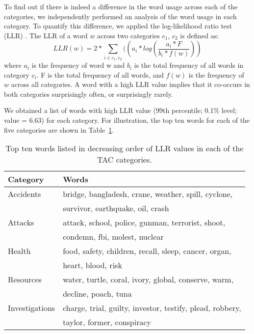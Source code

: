 To find out if there is indeed a difference in the word usage across each of the categories, we independently performed an analysis of the word usage in each category. To quantify this difference, we applied the log-likelihood ratio test (LLR) \cite{llr}. The LLR of a word $w$ across two categories $c_{1}$, $c_{2}$ is defined as:
\begin{displaymath}
LLR(w) = 2*\sum_{i\in {c_{1},c_{2}}}((a_i*log(\frac{a_i*F}{b_i*f(w)})) 
\end{displaymath}
where $a_i$ is the frequency of word w and $b_i$ is the total frequency of all words in category $c_i$. F is the total frequency of all words, and $f(w)$ is the frequency of $w$ across all categories. A word with a high LLR value implies that it co-occurs in both categories surprisingly often, or surprisingly rarely.

We obtained a list of words with high LLR value (99th percentile; 0.1\% level; value = 6.63) for each category. 
For illustration, the top ten words for each of the five categories are shown in Table~\ref{table:csi_list}.

\begin{table}[h]
\centering
\begin{center}
\begin{tabular}{l||l}
\textbf{Category} & \textbf{Words}  \\ \hline
Accidents & bridge, bangladesh, crane, weather, spill, cyclone, \\
          & survivor, earthquake, oil, crash \\
Attacks   & attack, school, police, gunman, terrorist, shoot, \\
          & condemn, fbi, molest, nuclear \\
Health    & food, safety, children, recall, sleep, cancer, organ, \\
          & heart, blood, risk\\
Resources & water, turtle, coral, ivory, global, conserve, warm, \\
          & decline, poach, tuna\\
Investigations& charge, trial, guilty, investor, testify, plead, robbery, \\
              & taylor, former, conspiracy\\
\end{tabular}
\end{center}
\caption{Top ten words listed in decreasing order of LLR values in each of the TAC categories.}
\label{table:csi_list}
\end{table}

